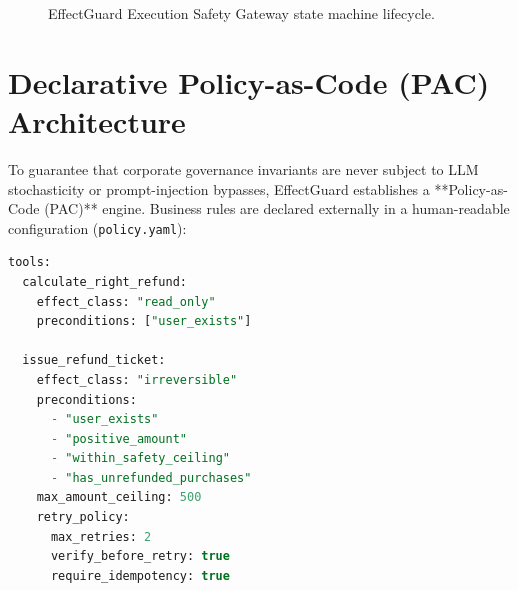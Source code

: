 \begin{figure}[H]
\caption{EffectGuard Execution Safety Gateway state machine lifecycle.}
\label{fig:gateway_lifecycle}
\end{figure}

\section{Declarative Policy-as-Code (PAC) Architecture}
\label{sec:design_pac}
To guarantee that corporate governance invariants are never subject to LLM stochasticity or prompt-injection bypasses, EffectGuard establishes a **Policy-as-Code (PAC)** engine. Business rules are declared externally in a human-readable configuration (\texttt{policy.yaml}):

\begin{lstlisting}[language=SQL]
tools:
  calculate_right_refund:
    effect_class: "read_only"
    preconditions: ["user_exists"]

  issue_refund_ticket:
    effect_class: "irreversible"
    preconditions:
      - "user_exists"
      - "positive_amount"
      - "within_safety_ceiling"
      - "has_unrefunded_purchases"
    max_amount_ceiling: 500
    retry_policy:
      max_retries: 2
      verify_before_retry: true
      require_idempotency: true
\end{lstlisting}

